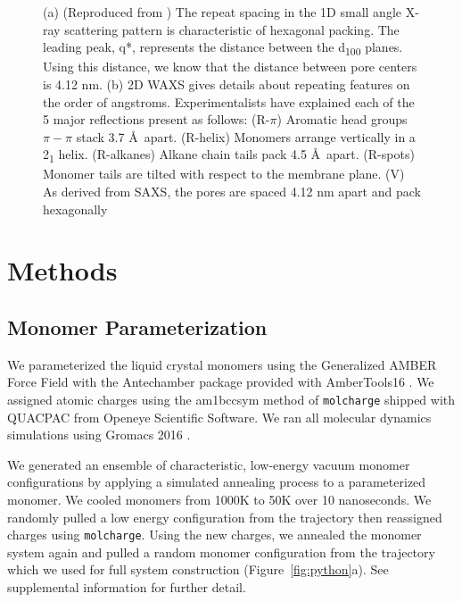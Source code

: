\documentclass[journal=jpcbfk,manusciprt=article]{achemso}
\begin{document}
\begin{figure}
\begin{subfigure}[t]{0.47\linewidth}
                \caption{}\label{fig:WAXS}
        \end{subfigure}
	\caption{(a) (Reproduced from \cite{feng_thin_2016}) The repeat spacing
		in the 1D small angle X-ray scattering pattern is characteristic of hexagonal
		packing. The leading peak, q*, represents the distance between the
		d\textsubscript{100} planes. Using this distance, we know that the distance
		between pore centers is 4.12 nm. (b) 2D WAXS gives
		details about repeating features on the order of angstroms. Experimentalists
		have explained each of the 5 major reflections present as follows: (R-$\pi$) Aromatic
		head groups $\pi-\pi$ stack 3.7 \AA~apart. (R-helix) Monomers arrange vertically in
		a 2\textsubscript{1} helix. (R-alkanes) Alkane chain tails pack 4.5 \AA~apart. (R-spots)
		Monomer tails are tilted with respect to the membrane plane. (V) As derived from
		SAXS, the pores are spaced 4.12 nm apart and pack hexagonally}
	\label{fig:SWAXS}
 \end{figure}

  \section{Methods}
 
  \subsection{Monomer Parameterization}

  We parameterized the liquid crystal monomers using the Generalized AMBER
  Force Field \cite{wang_development_2004} with the Antechamber package
  \cite{wang_automatic_2006} provided with AmberTools16
  \cite{case_ambertools16_2016}. We assigned atomic charges using the am1bccsym
  method of \texttt{molcharge} shipped with QUACPAC from Openeye Scientific
  Software. We ran all molecular dynamics simulations using Gromacs 2016
  \cite{bekker_gromacs:_1993,berendsen_gromacs:_1995,van_der_spoel_gromacs:_2005,hess_gromacs_2008}.

  We generated an ensemble of characteristic, low-energy vacuum monomer
  configurations by applying a simulated annealing process to a
  parameterized monomer. We cooled monomers from 1000K to 50K over 10
  nanoseconds. We randomly pulled a low energy configuration from the
  trajectory then reassigned charges using \texttt{molcharge}. Using the new
  charges, we annealed the monomer system again and pulled a random monomer
  configuration from the trajectory which we used for full system
  construction (Figure~\ref{fig:python}a). See supplemental information for
  further detail.
\end{document}
